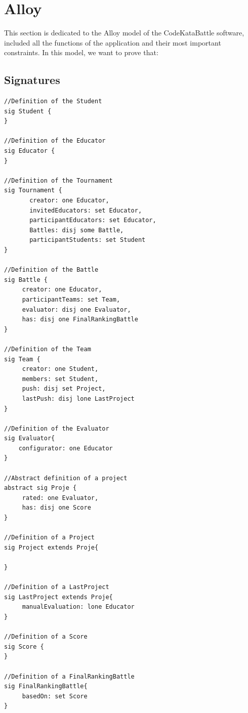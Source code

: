 \section{Alloy}
This section is dedicated to the Alloy model of the CodeKataBattle software, included all the functions of the application and their most important constraints. 
\newline
In this model, we want to prove that:
\subsection{Signatures}

\begin{lstlisting}
//Definition of the Student
sig Student {
}

//Definition of the Educator
sig Educator {
}

//Definition of the Tournament
sig Tournament {
	   creator: one Educator,                 
	   invitedEducators: set Educator,   
	   participantEducators: set Educator,  
	   Battles: disj some Battle, 
	   participantStudents: set Student   
} 

//Definition of the Battle
sig Battle {
 	 creator: one Educator,                       
  	 participantTeams: set Team,             
	 evaluator: disj one Evaluator,            
	 has: disj one FinalRankingBattle    
}

//Definition of the Team
sig Team {
	 creator: one Student,                         
	 members: set Student,                       
	 push: disj set Project,                     
	 lastPush: disj lone LastProject         
}

//Definition of the Evaluator
sig Evaluator{
	configurator: one Educator              
} 

//Abstract definition of a project
abstract sig Proje {
	 rated: one Evaluator,                  
	 has: disj one Score                   
}

//Definition of a Project
sig Project extends Proje{

}

//Definition of a LastProject
sig LastProject extends Proje{
	 manualEvaluation: lone Educator
}

//Definition of a Score 
sig Score {
}

//Definition of a FinalRankingBattle
sig FinalRankingBattle{
	 basedOn: set Score         
}

\end{lstlisting}


\clearpage
